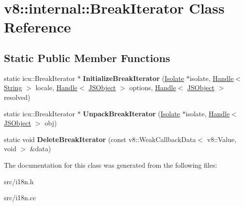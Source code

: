 \hypertarget{classv8_1_1internal_1_1_break_iterator}{}\section{v8\+:\+:internal\+:\+:Break\+Iterator Class Reference}
\label{classv8_1_1internal_1_1_break_iterator}
\subsection*{Static Public Member Functions}
\begin{DoxyCompactItemize}
\item 
\hypertarget{classv8_1_1internal_1_1_break_iterator_a1d623cf9da436f7d6d10e5c3e723618d}{}static icu\+::\+Break\+Iterator $\ast$ {\bfseries Initialize\+Break\+Iterator} (\hyperlink{classv8_1_1internal_1_1_isolate}{Isolate} $\ast$isolate, \hyperlink{classv8_1_1internal_1_1_handle}{Handle}$<$ \hyperlink{classv8_1_1internal_1_1_string}{String} $>$ locale, \hyperlink{classv8_1_1internal_1_1_handle}{Handle}$<$ \hyperlink{classv8_1_1internal_1_1_j_s_object}{J\+S\+Object} $>$ options, \hyperlink{classv8_1_1internal_1_1_handle}{Handle}$<$ \hyperlink{classv8_1_1internal_1_1_j_s_object}{J\+S\+Object} $>$ resolved)\label{classv8_1_1internal_1_1_break_iterator_a1d623cf9da436f7d6d10e5c3e723618d}

\item 
\hypertarget{classv8_1_1internal_1_1_break_iterator_a1d4d6ca04ef88722131f56b727967eea}{}static icu\+::\+Break\+Iterator $\ast$ {\bfseries Unpack\+Break\+Iterator} (\hyperlink{classv8_1_1internal_1_1_isolate}{Isolate} $\ast$isolate, \hyperlink{classv8_1_1internal_1_1_handle}{Handle}$<$ \hyperlink{classv8_1_1internal_1_1_j_s_object}{J\+S\+Object} $>$ obj)\label{classv8_1_1internal_1_1_break_iterator_a1d4d6ca04ef88722131f56b727967eea}

\item 
\hypertarget{classv8_1_1internal_1_1_break_iterator_aed441e8a20ba6d650d05dbe1710308fa}{}static void {\bfseries Delete\+Break\+Iterator} (const v8\+::\+Weak\+Callback\+Data$<$ v8\+::\+Value, void $>$ \&data)\label{classv8_1_1internal_1_1_break_iterator_aed441e8a20ba6d650d05dbe1710308fa}

\end{DoxyCompactItemize}


The documentation for this class was generated from the following files\+:\begin{DoxyCompactItemize}
\item 
src/i18n.\+h\item 
src/i18n.\+cc\end{DoxyCompactItemize}
